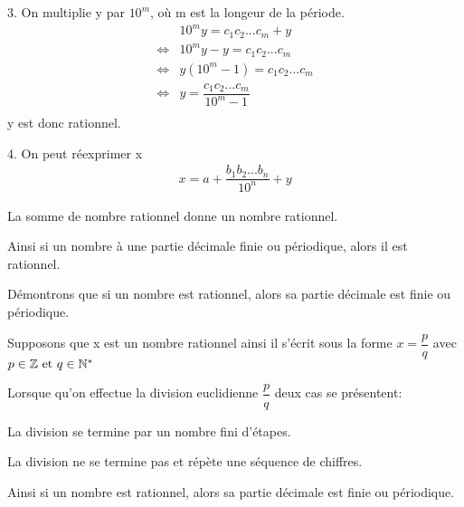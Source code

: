 \documentclass[a4paper, 12pt]{article}
\begin{document}
\begin{demonstration}
    3. On multiplie y par $10^m$, où m est la longeur de la période.
    \begin{align*}
        &10^m y = c_1c_2...c_m + y \\
        \iff& 10^m y - y = c_1c_2...c_m \\
        \iff& y(10^m - 1) = c_1c_2...c_m \\
        \iff& y = \dfrac{c_1c_2...c_m}{10^m - 1} \\
    \end{align*}
    y est donc rationnel.

    \vspace{0.5em}

    4. On peut réexprimer x
    \begin{align*}
        x = a + \dfrac{b_1b_2...b_n}{10^n} + y
    \end{align*}

    La somme de nombre rationnel donne un nombre rationnel.
    
    Ainsi si un nombre à une partie décimale finie ou périodique, alors il est rationnel.


\end{demonstration}

\begin{demonstration}
    Démontrons que si un nombre est rationnel, alors sa partie décimale est finie ou périodique.

    Supposons que x est un nombre rationnel ainsi il s'écrit sous la forme
    $x = \dfrac{p}{q}$ avec $p \in \mathbb{Z} \text{ et } q \in \mathbb{N}^*$

    Lorsque qu'on effectue la division euclidienne $\dfrac{p}{q}$ deux cas se présentent:

    La division se termine par un nombre fini d'étapes.

    La division ne se termine pas et répète une séquence de chiffres.

    Ainsi si un nombre est rationnel, alors sa partie décimale est finie ou périodique.

\end{demonstration}
\end{document}
